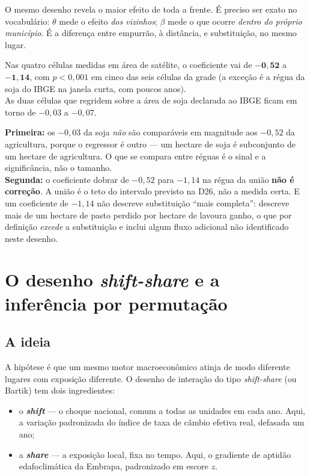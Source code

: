 O mesmo desenho revela o maior efeito de toda a frente. É preciso ser exato no
vocabulário: $\theta$ mede o efeito \emph{dos vizinhos}; $\beta$ mede o que
ocorre \emph{dentro do próprio município}. É a diferença entre empurrão, à
distância, e substituição, no mesmo lugar.

\begin{ancora}
Nas quatro células medidas em área de satélite, o coeficiente vai de
$\mathbf{-0{,}52}$ a $\mathbf{-1{,}14}$, com $p < 0{,}001$ em cinco das seis
células da grade (a exceção é a régua da soja do IBGE na janela curta, com
poucos anos). \\
As duas células que regridem sobre a área de soja declarada ao IBGE ficam em
torno de $-0{,}03$ a $-0{,}07$.
\end{ancora}

\begin{armadilha}
\textbf{Primeira:} os $-0{,}03$ da soja \emph{não} são comparáveis em magnitude
aos $-0{,}52$ da agricultura, porque o regressor é outro --- um hectare de soja
é subconjunto de um hectare de agricultura. O que se compara entre réguas é o
sinal e a significância, não o tamanho. \\[4pt]
\textbf{Segunda:} o coeficiente dobrar de $-0{,}52$ para $-1{,}14$ na régua da
união \textbf{não é correção}. A união é o teto do intervalo previsto na D26,
não a medida certa. E um coeficiente de $-1{,}14$ não descreve substituição
``mais completa'': descreve mais de um hectare de pasto perdido por hectare de
lavoura ganho, o que por definição \emph{excede} a substituição e inclui algum
fluxo adicional não identificado neste desenho.
\end{armadilha}

\chapter{O desenho \emph{shift-share} e a inferência por permutação}
\label{cap:shiftshare}

\section{A ideia}

A hipótese é que um mesmo motor macroeconômico atinja de modo diferente lugares
com exposição diferente. O desenho de interação do tipo \emph{shift-share} (ou
Bartik) tem dois ingredientes:

\begin{itemize}
\item o \textbf{\emph{shift}} --- o choque nacional, comum a todas as unidades
em cada ano. Aqui, a variação padronizada do índice de taxa de câmbio efetiva
real, defasada um ano;
\item a \textbf{\emph{share}} --- a exposição local, fixa no tempo. Aqui, o
gradiente de aptidão edafoclimática da Embrapa, padronizado em escore $z$.
\end{itemize}

